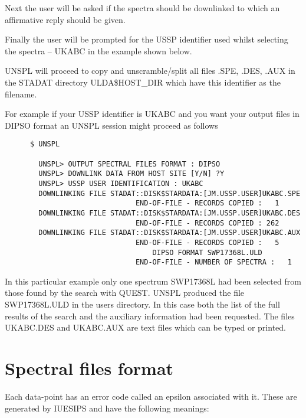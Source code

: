 Next the user will be asked if the spectra should be downlinked to which an
affirmative reply should be given.

Finally the user will be prompted for the USSP identifier used whilst
selecting the spectra -- UKABC in the example shown below.

UNSPL will proceed to copy and unscramble/split all files .SPE, .DES, .AUX
in the STADAT directory ULDA\$HOST\_DIR which have this identifier
as the filename.

For example if your USSP identifier is UKABC and you want your output files in
DIPSO format an UNSPL session might proceed as follows
\begin{verbatim}
      $ UNSPL

        UNSPL> OUTPUT SPECTRAL FILES FORMAT : DIPSO
        UNSPL> DOWNLINK DATA FROM HOST SITE [Y/N] ?Y
        UNSPL> USSP USER IDENTIFICATION : UKABC
        DOWNLINKING FILE STADAT::DISK$STARDATA:[JM.USSP.USER]UKABC.SPE
                               END-OF-FILE - RECORDS COPIED :   1
        DOWNLINKING FILE STADAT::DISK$STARDATA:[JM.USSP.USER]UKABC.DES
                               END-OF-FILE - RECORDS COPIED : 262
        DOWNLINKING FILE STADAT::DISK$STARDATA:[JM.USSP.USER]UKABC.AUX
                               END-OF-FILE - RECORDS COPIED :   5
                                   DIPSO FORMAT SWP17368L.ULD
                               END-OF-FILE - NUMBER OF SPECTRA :   1
\end{verbatim}
In this particular example only one spectrum SWP17368L had been selected
from those found by the search with QUEST.
UNSPL produced the file SWP17368L.ULD in the users directory.
In this case both the list of the full results of the search and the
auxiliary information  had been requested.
The files UKABC.DES and UKABC.AUX are text files which can be typed or printed.

\section{Spectral files format}

Each data-point has an error code called an epsilon associated with it.
These are generated by  IUESIPS and have the following meanings:

